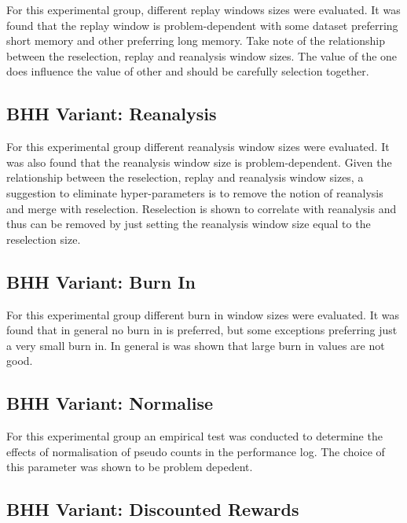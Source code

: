 For this experimental group, different replay windows sizes were evaluated. It was found that the replay window is problem-dependent with some dataset preferring short memory and other preferring long memory. Take note of the relationship between the reselection, replay and reanalysis window sizes. The value of the one does influence the value of other and should be carefully selection together.

\subsection{\ac{BHH} Variant: Reanalysis}
\label{sec:conclusion:results:summary:reanalysis}

For this experimental group different reanalysis window sizes were evaluated. It was also found that the reanalysis window size is problem-dependent. Given the relationship between the reselection, replay and reanalysis window sizes, a suggestion to eliminate hyper-parameters is to remove the notion of reanalysis and merge with reselection. Reselection is shown to correlate with reanalysis and thus can be removed by just setting the reanalysis window size equal to the reselection size.

\subsection{\ac{BHH} Variant: Burn In}
\label{sec:conclusion:results:summary:burn_in}

For this experimental group different burn in window sizes were evaluated. It was found that in general no burn in is preferred, but some exceptions preferring just a very small burn in. In general is was shown that large burn in values are not good.

\subsection{\ac{BHH} Variant: Normalise}
\label{sec:conclusion:results:summary:normalise}

For this experimental group an empirical test was conducted to determine the effects of normalisation of pseudo counts in the performance log. The choice of this parameter was shown to be problem depedent.

\subsection{\ac{BHH} Variant: Discounted Rewards}
\label{sec:conclusion:results:summary:discounted_rewards}

